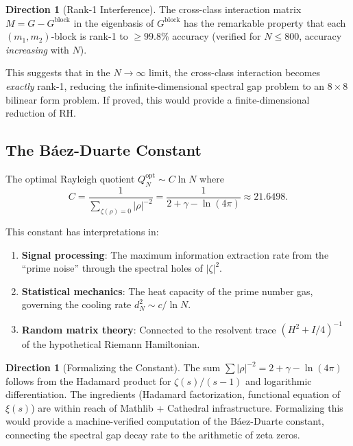\documentclass[11pt,a4paper]{article}
\theoremstyle{definition}
\newtheorem{direction}[definition]{Direction}
\begin{document}
\begin{direction}[Rank-1 Interference]
The cross-class interaction matrix $M = G - G^{\mathrm{block}}$ in the
eigenbasis of $G^{\mathrm{block}}$ has the remarkable property that each
$(m_1, m_2)$-block is rank-1 to $\ge 99.8\%$ accuracy (verified for
$N \le 800$, accuracy \emph{increasing} with $N$).

This suggests that in the $N \to \infty$ limit, the cross-class
interaction becomes \emph{exactly} rank-1, reducing the infinite-dimensional
spectral gap problem to an $8 \times 8$ bilinear form problem. If proved,
this would provide a finite-dimensional reduction of RH.
\end{direction}

\subsection{The B\'aez-Duarte Constant}

The optimal Rayleigh quotient $Q_N^{\mathrm{opt}} \sim C \ln N$ where
\[
  C = \frac{1}{\sum_{\zeta(\rho)=0} |\rho|^{-2}}
  = \frac{1}{2 + \gamma - \ln(4\pi)}
  \approx 21.6498.
\]

This constant has interpretations in:
\begin{enumerate}
  \item \textbf{Signal processing}: The maximum information extraction
    rate from the ``prime noise'' through the spectral holes of $|\zeta|^2$.
  \item \textbf{Statistical mechanics}: The heat capacity of the prime
    number gas, governing the cooling rate $d_N^2 \sim c/\ln N$.
  \item \textbf{Random matrix theory}: Connected to the resolvent trace
    $(H^2 + I/4)^{-1}$ of the hypothetical Riemann Hamiltonian.
\end{enumerate}

\begin{direction}[Formalizing the Constant]
The sum $\sum |\rho|^{-2} = 2 + \gamma - \ln(4\pi)$ follows from the
Hadamard product for $\zeta(s)/(s-1)$ and logarithmic differentiation.
The ingredients (Hadamard factorization, functional equation of $\xi(s)$)
are within reach of Mathlib + Cathedral infrastructure. Formalizing this
would provide a machine-verified computation of the B\'aez-Duarte
constant, connecting the spectral gap decay rate to the arithmetic of
zeta zeros.
\end{direction}

\end{document}
